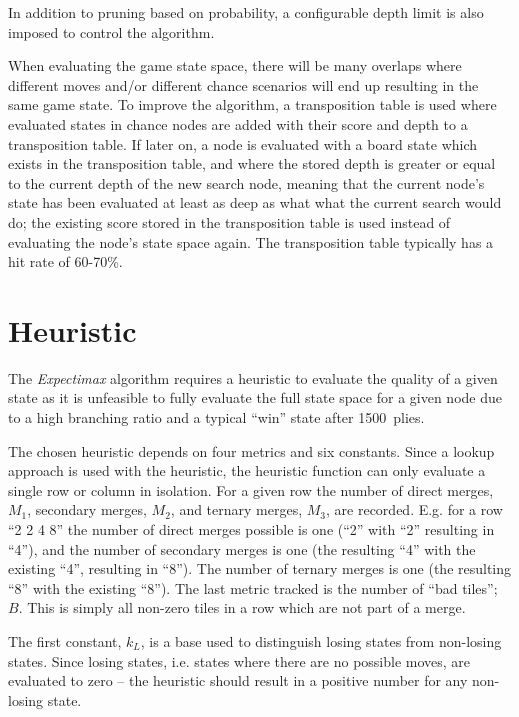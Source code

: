 In addition to pruning based on probability, a configurable depth limit is also imposed to control the algorithm.

When evaluating the game state space, there will be many overlaps where different moves and/or different chance scenarios will end up resulting in the same game state. To improve the algorithm, a transposition table is used where evaluated states in chance nodes are added with their score and depth to a transposition table. If later on, a node is evaluated with a board state which exists in the transposition table, and where the stored depth is greater or equal to the current depth of the new search node, meaning that the current node's state has been evaluated at least as deep as what what the current search would do; the existing score stored in the transposition table is used instead of evaluating the node's state space again. The transposition table typically has a hit rate of 60-70\%.

\section*{Heuristic}

The \textit{Expectimax} algorithm requires a heuristic to evaluate the quality of a given state as it is unfeasible to fully evaluate the full state space for a given node due to a high branching ratio and a typical ``win'' state after 1500~plies.

The chosen heuristic depends on four metrics and six constants. Since a lookup approach is used with the heuristic, the heuristic function can only evaluate a single row or column in isolation. For a given row the number of direct merges, $M_1$, secondary merges, $M_2$, and ternary merges, $M_3$, are recorded. E.g. for a row ``2 2 4 8'' the number of direct merges possible is one (``2'' with ``2'' resulting in ``4''), and the number of secondary merges is one (the resulting ``4'' with the existing ``4'', resulting in ``8''). The number of ternary merges is one (the resulting ``8'' with the existing ``8''). The last metric tracked is the number of ``bad tiles''; $B$. This is simply all non-zero tiles in a row which are not part of a merge.

The first constant, $k_L$, is a base used to distinguish losing states from non-losing states. Since losing states, i.e. states where there are no possible moves, are evaluated to zero -- the heuristic should result in a positive number for any non-losing state.

